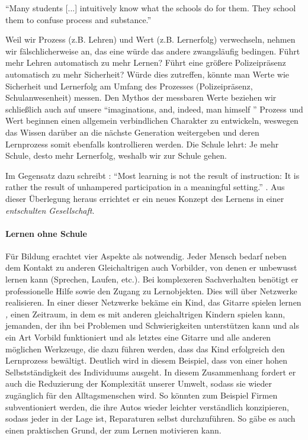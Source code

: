 \epigraph{
		``Many students [...] intuitively know what the schools do for them. They school them to confuse process and substance.''}
	{
		\citep[3]{Illich-1971
	}

Weil wir Prozess (z.B. Lehren) und Wert (z.B. Lernerfolg) verwechseln, nehmen wir fälschlicherweise an, das eine würde das andere zwangsläufig bedingen.
Führt mehr Lehren automatisch zu mehr Lernen?
Führt eine größere Polizeipräsenz automatisch zu mehr Sicherheit?
Würde dies zutreffen, könnte man Werte wie Sicherheit und Lernerfolg am Umfang des Prozesses (Polizeipräsenz, Schulanwesenheit) messen.
Den Mythos der messbaren Werte beziehen wir schließlich auch auf unsere ``imaginations, and, indeed, man himself '' \citep[19]{Illich-1971}
Prozess und Wert beginnen einen allgemein verbindlichen Charakter zu entwickeln, weswegen das Wissen darüber an die nächste Generation weitergeben und deren Lernprozess somit ebenfalls kontrollieren werden.
Die Schule lehrt: Je mehr Schule, desto mehr Lernerfolg, weshalb wir zur Schule gehen.

Im Gegensatz dazu schreibt \citeauthor{Illich-1971}:
``Most learning is not the result of instruction: It is rather the result of unhampered participation in a meaningful setting.'' \citep[18]{Illich-1971}.
Aus dieser Überlegung heraus errichtet er ein neues Konzept des Lernens in einer \emph{entschulten Gesellschaft}.

\paragraph*{Lernen ohne Schule}

Für Bildung erachtet \citeauthor{Illich-1971} vier Aspekte als notwendig.
Jeder Mensch bedarf neben dem Kontakt zu anderen Gleichaltrigen auch Vorbilder, von denen er unbewusst lernen kann (Sprechen, Laufen, etc.).
Bei komplexeren Sachverhalten benötigt er professionelle Hilfe sowie den Zugang zu Lernobjekten.
Dies will \citeauthor{Illich-1971} über Netzwerke realisieren.
In einer dieser Netzwerke bekäme ein Kind, das Gitarre spielen lernen \emph, einen Zeitraum, in dem es mit anderen gleichaltrigen Kindern spielen kann, jemanden, der ihn bei Problemen und Schwierigkeiten unterstützen kann und als ein Art Vorbild funktioniert und als letztes eine Gitarre und alle anderen möglichen Werkzeuge, die dazu führen werden, dass das Kind erfolgreich den Lernprozess bewältigt.
Deutlich wird in diesem Beispiel, dass \citeauthor{Illich-1971} von einer hohen Selbstständigkeit des Individuums ausgeht.
In diesem Zusammenhang fordert er auch die Reduzierung der Komplexität unserer Umwelt, sodass sie wieder zugänglich für den Alltagsmenschen wird.
So könnten zum Beispiel Firmen subventioniert werden, die ihre Autos wieder leichter verständlich konzipieren, sodass jeder in der Lage ist, Reparaturen selbst durchzuführen.
So gäbe es auch einen praktischen Grund, der zum Lernen motivieren kann.


}
